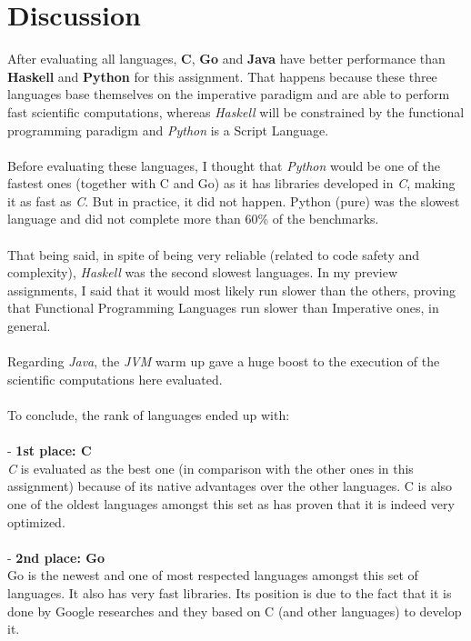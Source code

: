 \documentclass[conference]{IEEEtran}
\begin{document}
\section{Discussion}
After evaluating all languages, \textbf{C}, \textbf{Go} and \textbf{Java} have better performance than \textbf{Haskell} and \textbf{Python} for this assignment. That happens because these three languages base themselves on the imperative paradigm and are able to perform fast scientific computations, whereas \textit{Haskell} will be constrained by the functional programming paradigm and \textit{Python} is a Script Language.
\\\\
Before evaluating these languages, I thought that \textit{Python} would be one of the fastest ones (together with C and Go) as it has libraries developed in \textit{C}, making it as fast as \textit{C}. But in practice, it did not happen. Python (pure) was the slowest language and did not complete more than 60\% of the benchmarks.\\\\
That being said, in spite of being very reliable (related to code safety and complexity), \textit{Haskell} was the second slowest languages. In my preview assignments, I said that it would most likely run slower than the others, proving that Functional Programming Languages run slower than Imperative ones, in general.
\\\\
Regarding \textit{Java}, the \textit{JVM} warm up gave a huge boost to the execution of the scientific computations here evaluated.
\\\\
To conclude, the rank of languages ended up with:
\\\\
- \textbf{1st place: C}\\
\textit{C} is evaluated as the best one (in comparison with the other ones in this assignment) because of its native advantages over the other languages. C is also one of the oldest languages amongst this set as has proven that it is indeed very optimized.
\\\\
- \textbf{2nd place: Go}\\
Go is the newest and one of most respected languages amongst this set of languages. It also has very fast libraries. Its position is due to the fact that it is done by Google researches and they based on C (and other languages) to develop it.
\\\\
\end{document}
